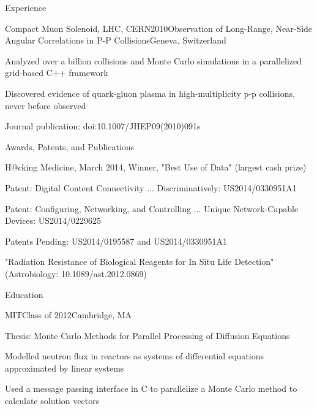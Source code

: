 \documentclass{resume}
\begin{document}
\begin{rSection}{Experience}
\begin{rSubsection}{Compact Muon Solenoid, LHC, CERN}{2010}{Observation of Long-Range, Near-Side Angular Correlations in P-P Collisions}{Geneva, Switzerland}
\item Analyzed over a billion collisions and Monte Carlo simulations in a parallelized grid-based C++ framework
\item Discovered evidence of quark-gluon plasma in high-multiplicity p-p collisions, never before observed
\item Journal publication: doi:10.1007/JHEP09(2010)091s
\end{rSubsection}

\end{rSection}

\begin{rSection}{Awards, Patents, and Publications}

\begin{rSubsection}{}{}{}{}
\item H@cking Medicine, March 2014, Winner, "Best Use of Data" (largest cash prize)
\item Patent: Digital Content Connectivity ... Discriminatively: US2014/0330951A1
\item Patent: Configuring, Networking, and Controlling ... Unique Network-Capable Devices: US2014/0229625
\item Patents Pending: US2014/0195587 and US2014/0330951A1
\item "Radiation Resistance of Biological Reagents for In Situ Life Detection" (Astrobiology: 10.1089/ast.2012.0869)
\end{rSubsection}

\end{rSection}

\begin{rSection}{Education}

\begin{rSubsection}{MIT}{Class of 2012}{Cambridge, MA}

\item Thesis: Monte Carlo Methods for Parallel Processing of Diffusion Equations
\item Modelled neutron flux in reactors as systems of differential equations approximated by linear systems
\item Used a message passing interface in C to parallelize a Monte Carlo method to calculate solution vectors
\end{rSubsection}

\end{rSection}
\end{document}
